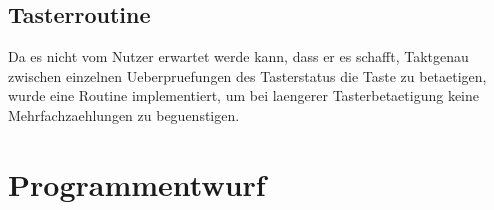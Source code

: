 \subsection{Tasterroutine}
Da es nicht vom Nutzer erwartet werde kann, dass er es schafft, Taktgenau zwischen einzelnen Ueberpruefungen des Tasterstatus die Taste zu betaetigen, wurde eine Routine implementiert, um bei laengerer Tasterbetaetigung keine Mehrfachzaehlungen zu beguenstigen.

\section{Programmentwurf}
